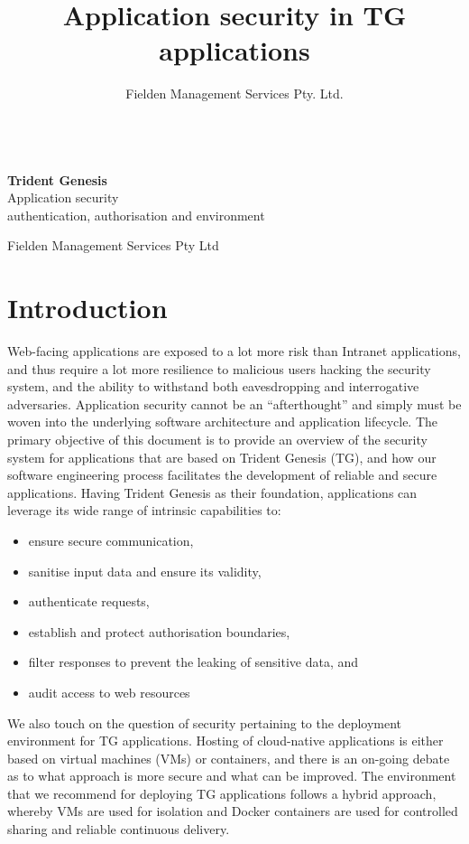\documentclass[a4paper,12pt,oneside,openright]{memoir}
\title{Application security in TG applications}
\author{Fielden Management Services Pty. Ltd.}
\date{}
\newcommand*{\titleTH}{\begingroup%
\raggedleft
\vspace*{\baselineskip}
{\Large ~}\\[0.167\textheight]
{\bfseries Trident Genesis}\\[\baselineskip]
{\textcolor{basiccolor}{\Huge Application security}}\\[\baselineskip]
{\small authentication, authorisation and environment}\par
\vfill
{\Large Fielden Management Services Pty Ltd}\par
\endgroup}
\begin{document}
\titleTH
\thispagestyle{empty}
\clearpage
{}


\onehalfspacing

\section*{Introduction}\label{sec:00}
	Web-facing applications are exposed to a lot more risk than Intranet applications, and thus require a lot more resilience to malicious users hacking the security system, and the ability to withstand both eavesdropping and interrogative adversaries.
	Application security cannot be an ``afterthought'' and simply must be woven into the underlying software architecture and application lifecycle.
	The primary objective of this document is to provide an overview of the security system for applications that are based on Trident Genesis (TG), and how our software engineering process facilitates the development of reliable and secure applications.
	Having Trident Genesis as their foundation, applications can leverage its wide range of intrinsic capabilities to:

	\begin{itemize}
	\item ensure secure communication,
	\item sanitise input data and ensure its validity,
	\item authenticate requests,
	\item establish and protect authorisation boundaries,
	\item filter responses to prevent the leaking of sensitive data, and
	\item audit access to web resources
	\end{itemize}

	We also touch on the question of security pertaining to the deployment environment for TG applications.
    Hosting of cloud-native applications is either based on virtual machines (VMs) or containers, and there is an on-going debate as to what approach is more secure and what can be improved.
	The environment that we recommend for deploying TG applications follows a hybrid approach, whereby VMs are used for isolation and Docker containers are used for controlled sharing and reliable continuous delivery.
\end{document}
